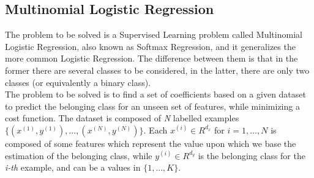 \documentclass[a4paper,11pt,oneside]{book}
\begin{document}
\subsection {Multinomial Logistic Regression} \label{Subsec1.1.2}
The problem to be solved is a Supervised Learning problem called Multinomial Logistic Regression, also known as Softmax Regression, and it generalizes the more common Logistic Regression. The difference between them is that in the former there are several classes to be considered, in the latter, there are only two classes (or equivalently a binary class).\\
The problem to be solved is to find a set of coefficients based on a given dataset to predict the belonging class for an unseen set of features, while minimizing a cost function. The dataset is composed of \textit{N} labelled examples $\{(x^{(1)}, y^{(1)}), ..., (x^{(N)}, y^{(N)})\}$. Each $x^{(i)} \in R^{d_{x}}$ for $i=1, ..., N$ is composed of some features which represent the value upon which we base the estimation of the belonging class, while $y^{(i)} \in R^{d_{y}}$ is the belonging class for the \textit{i-th} example, and can be a values in $\{1, ..., K\}$.
\end{document}
